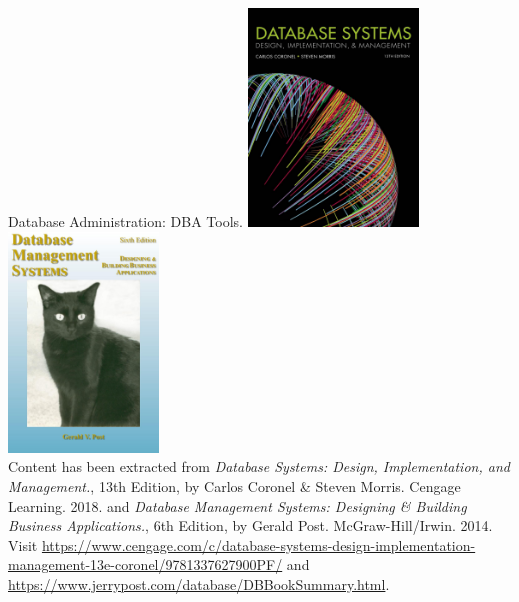 \documentclass{beamer}
\begin{document}
\begin{frame}{Database Administration: DBA Tools.}
    \centering
    \includegraphics[width=0.34\textwidth]{figures/book_cover2.jpg}
    \includegraphics[width=0.3\textwidth]{figures/book_cover3.jpg} \\
    \vspace{5mm}
    {
        \tiny
        Content has been extracted from \textit{Database Systems: Design, Implementation, and Management.}, 13th Edition, by Carlos Coronel \& Steven Morris. Cengage Learning. 2018. and \textit{Database Management Systems: Designing \& Building Business Applications.}, 6th Edition, by Gerald Post. McGraw-Hill/Irwin. 2014. \\
        Visit \url{https://www.cengage.com/c/database-systems-design-implementation-management-13e-coronel/9781337627900PF/} and \url{https://www.jerrypost.com/database/DBBookSummary.html}.\\
    }
\end{frame}
\end{document}
